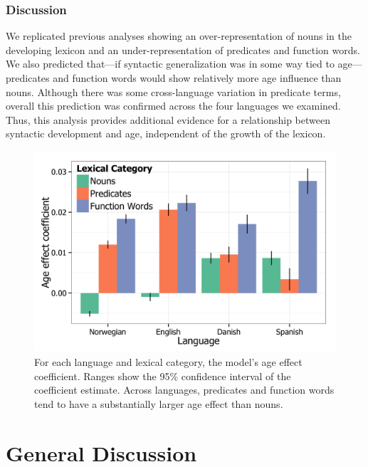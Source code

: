 \documentclass[10pt,letterpaper]{article}
\begin{document}
\subsubsection{Discussion}

We replicated previous analyses \cite{bates1994} showing an over-representation of nouns in the developing lexicon and an under-representation of predicates and function words. We also predicted that---if syntactic generalization was in some way tied to age---predicates and function words would show relatively more age influence than nouns. Although there was some cross-language variation in predicate terms, overall this prediction was confirmed across the four languages we examined. Thus, this analysis provides additional evidence for a relationship between syntactic development and age, independent of the growth of the lexicon.

\begin{figure}
\centering
\includegraphics[width=\linewidth]{plots/coefs_vocab_comp.png}
\caption{\label{fig:coefs_vocab_comp} For each language and lexical category, the model's age effect coefficient. Ranges show the 95\% confidence interval of the coefficient estimate. Across languages, predicates and function words tend to have a substantially larger age effect than nouns.}
\end{figure}

\section{General Discussion}
\end{document}
